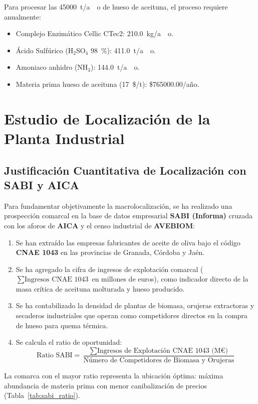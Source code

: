 \documentclass{report}
\begin{document}
\begin{tcolorbox}[colback=blue!5!white,colframe=blue!75!black,title=\textbf{Consumos de Reactivos Clave Calculados}]
    Para procesar las \SI{45000}{\tonne/ao} de hueso de aceituna, el proceso requiere anualmente:
    \begin{itemize}
        \item Complejo Enzimático Cellic CTec2: \SI{210.0}{\kilo\gram/ao}.
        \item Ácido Sulfúrico ($\text{H}_2\text{SO}_4$ \SI{98}{\percent}): \SI{411.0}{\tonne/ao}.
        \item Amoniaco anhidro ($\text{NH}_3$): \SI{144.0}{\tonne/ao}.
        \item Materia prima hueso de aceituna (\SI{17}{\$/\tonne}): \$\num{765000.00}/año.
    \end{itemize}
\end{tcolorbox}

\chapter{Estudio de Localización de la Planta Industrial}

\section{Justificación Cuantitativa de Localización con SABI y AICA}
Para fundamentar objetivamente la macrolocalización, se ha realizado una prospección comarcal en la base de datos empresarial \textbf{SABI (Informa)} cruzada con los aforos de \textbf{AICA} y el censo industrial de \textbf{AVEBIOM}:
\begin{enumerate}
    \item Se han extraído las empresas fabricantes de aceite de oliva bajo el código \textbf{CNAE 1043} en las provincias de Granada, Córdoba y Jaén.
    \item Se ha agregado la cifra de ingresos de explotación comarcal ($\sum \text{Ingresos CNAE 1043}$ en millones de euros), como indicador directo de la masa crítica de aceituna molturada y hueso producido.
    \item Se ha contabilizado la densidad de plantas de biomasa, orujeras extractoras y secaderos industriales que operan como competidores directos en la compra de hueso para quema térmica.
    \item Se calcula el ratio de oportunidad:
          \begin{equation}
              \text{Ratio SABI} = \frac{\sum \text{Ingresos de Explotación CNAE 1043 (M€)}}{\text{Número de Competidores de Biomasa y Orujeras}}
          \end{equation}
\end{enumerate}
La comarca con el mayor ratio representa la ubicación óptima: máxima abundancia de materia prima con menor canibalización de precios (Tabla~\ref{tab:sabi_ratio}).
\end{document}
